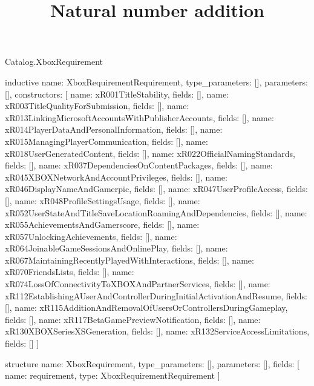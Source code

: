 \begin{lexlean}{Catalog.XboxRequirement}
\title{Natural number addition}
\begin{semanticmodule}
inductive{
  name: XboxRequirementRequirement,
  type_parameters: [],
  parameters: [],
  constructors: [
    {name: xR001TitleStability, fields: []},
    {name: xR003TitleQualityForSubmission, fields: []},
    {name: xR013LinkingMicrosoftAccountsWithPublisherAccounts, fields: []},
    {name: xR014PlayerDataAndPersonalInformation, fields: []},
    {name: xR015ManagingPlayerCommunication, fields: []},
    {name: xR018UserGeneratedContent, fields: []},
    {name: xR022OfficialNamingStandards, fields: []},
    {name: xR037DependenciesOnContentPackages, fields: []},
    {name: xR045XBOXNetworkAndAccountPrivileges, fields: []},
    {name: xR046DisplayNameAndGamerpic, fields: []},
    {name: xR047UserProfileAccess, fields: []},
    {name: xR048ProfileSettingsUsage, fields: []},
    {name: xR052UserStateAndTitleSaveLocationRoamingAndDependencies, fields: []},
    {name: xR055AchievementsAndGamerscore, fields: []},
    {name: xR057UnlockingAchievements, fields: []},
    {name: xR064JoinableGameSessionsAndOnlinePlay, fields: []},
    {name: xR067MaintainingRecentlyPlayedWithInteractions, fields: []},
    {name: xR070FriendsLists, fields: []},
    {name: xR074LossOfConnectivityToXBOXAndPartnerServices, fields: []},
    {name: xR112EstablishingAUserAndControllerDuringInitialActivationAndResume, fields: []},
    {name: xR115AdditionAndRemovalOfUsersOrControllersDuringGameplay, fields: []},
    {name: xR117BetaGamePreviewNotification, fields: []},
    {name: xR130XBOXSeriesXSGeneration, fields: []},
    {name: xR132ServiceAccessLimitations, fields: []}
  ]
}

structure{
  name: XboxRequirement,
  type_parameters: [],
  parameters: [],
  fields: [
    {name: requirement, type: XboxRequirementRequirement}
  ]
}
\end{semanticmodule}
\end{lexlean}
